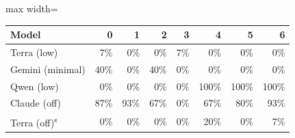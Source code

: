 \begin{adjustbox}{max width=\linewidth}
\begin{tabular}{@{}lrrrrrrr@{}}
\toprule
Model & 0 & 1 & 2 & 3 & 4 & 5 & 6 \\
\midrule
Terra (low) & 7\% & 0\% & 0\% & 7\% & 0\% & 0\% & 0\% \\
Gemini (minimal) & 40\% & 0\% & 40\% & 0\% & 0\% & 0\% & 0\% \\
Qwen (low) & 0\% & 0\% & 0\% & 0\% & 100\% & 100\% & 100\% \\
Claude (off) & 87\% & 93\% & 67\% & 0\% & 67\% & 80\% & 93\% \\
Terra (off)\textsuperscript{s} & 0\% & 0\% & 0\% & 0\% & 20\% & 0\% & 7\% \\
\bottomrule
\end{tabular}
\end{adjustbox}

\par{}
